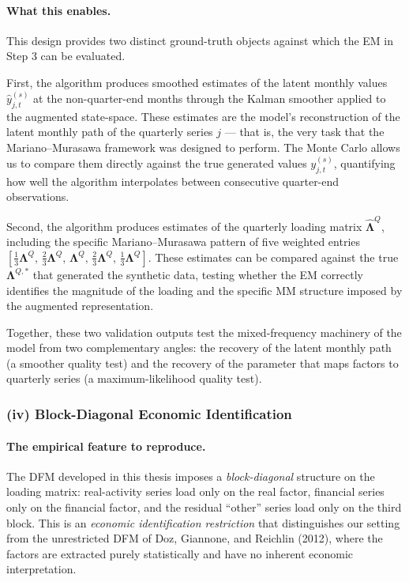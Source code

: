 \documentclass[11pt, a4paper, oneside]{article}
\begin{document}
\paragraph{What this enables.}
This design provides two distinct ground-truth objects against
which the EM in Step 3 can be evaluated.

First, the algorithm produces smoothed estimates of the latent
monthly values $\hat{y}_{j, t}^{(s)}$ at the non-quarter-end
months through the Kalman smoother applied to the augmented
state-space. These estimates are the model's reconstruction of
the latent monthly path of the quarterly series $j$ — that is,
the very task that the Mariano--Murasawa framework was designed
to perform. The Monte Carlo allows us to compare them directly
against the true generated values $y_{j, t}^{(s)}$, quantifying
how well the algorithm interpolates between consecutive
quarter-end observations.

Second, the algorithm produces estimates of the quarterly loading
matrix $\hat{\boldsymbol{\Lambda}}^Q$, including the specific
Mariano--Murasawa pattern of five weighted entries
$[\tfrac{1}{3}\boldsymbol{\Lambda}^Q,\, \tfrac{2}{3}\boldsymbol{\Lambda}^Q,\, \boldsymbol{\Lambda}^Q,\, \tfrac{2}{3}\boldsymbol{\Lambda}^Q,\, \tfrac{1}{3}\boldsymbol{\Lambda}^Q]$.
These estimates can be compared against the true
$\boldsymbol{\Lambda}^{Q, *}$ that generated the synthetic data,
testing whether the EM correctly identifies the magnitude of the
loading and the specific MM structure imposed by the augmented
representation.

Together, these two validation outputs test the mixed-frequency
machinery of the model from two complementary angles: the recovery
of the latent monthly path (a smoother quality test) and the
recovery of the parameter that maps factors to quarterly series
(a maximum-likelihood quality test).

\subsubsection*{(iv) Block-Diagonal Economic Identification}
\label{subsubsec:sim-block-structure}

\paragraph{The empirical feature to reproduce.}
The DFM developed in this thesis imposes a \emph{block-diagonal}
structure on the loading matrix: real-activity series load only on
the real factor, financial series only on the financial factor,
and the residual ``other'' series load only on the third block.
This is an \emph{economic identification restriction} that
distinguishes our setting from the unrestricted DFM of Doz,
Giannone, and Reichlin (2012), where the factors are extracted
purely statistically and have no inherent economic interpretation.
\end{document}
